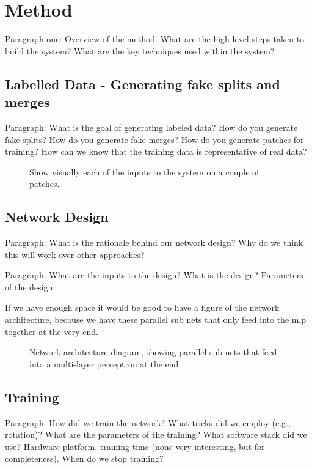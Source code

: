 \section{Method}

Paragraph one: Overview of the method. What are the high level steps taken to build the system? What are the key techniques used within the system?

\subsection{Labelled Data - Generating fake splits and merges}

Paragraph: What is the goal of generating labeled data? How do you generate fake splits? How do you generate fake merges? How do you generate patches for training? How can we know that the training data is representative of real data?

\begin{figure}
\caption{Show visually each of the inputs to the system on a couple of patches.}
\end{figure}

\subsection{Network Design}

Paragraph: What is the rationale behind our network design? Why do we think this will work over other approaches? 

Paragraph: What are the inputs to the design? What is the design? Parameters of the design.

If we have enough space it would be good to have a figure of the network architecture, because we have these 
parallel sub nets that only feed into the mlp together at the very end. 

\begin{figure}[t]
\caption{Network architecture diagram, showing parallel sub nets that feed into a multi-layer perceptron at the end.}
\end{figure}

\subsection{Training}

Paragraph: How did we train the network? What tricks did we employ (e.g., rotation)? What are the parameters of the training? What software stack did we use? Hardware platform, training time (none very interesting, but for completeness). When do we stop training?

